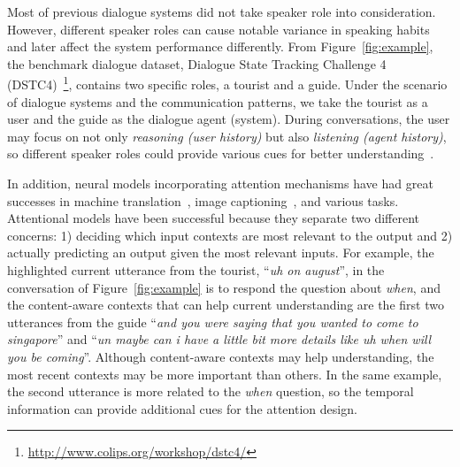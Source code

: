\documentclass{article}
\begin{document}

Most of previous dialogue systems did not take speaker role into consideration.
However, different speaker roles can cause notable variance in speaking habits and later affect the system performance differently. 
From Figure~\ref{fig:example}, the benchmark dialogue dataset, Dialogue State Tracking Challenge 4 (DSTC4)~\cite{kim2016fourth}\footnote{\url{http://www.colips.org/workshop/dstc4/}}, contains two specific roles, a tourist and a guide.
Under the scenario of dialogue systems and the communication patterns, we take the tourist as a user and the guide as the dialogue agent (system).
During conversations, the user may focus on not only \emph{reasoning (user history)} but also \emph{listening (agent history)}, so different speaker roles could provide various cues for better understanding~\cite{chi2017speaker}.

In addition, neural models incorporating attention mechanisms have had great successes in machine translation~\cite{bahdanau2014neural}, image captioning~\cite{xu2015show}, and various tasks. 
Attentional models have been successful because they separate two different concerns: 1) deciding which input contexts are most relevant to the output and 2) actually predicting an output given the most relevant inputs. 
For example, the highlighted current utterance from the tourist, ``\textit{uh on august}'', in the conversation of Figure~\ref{fig:example} is to respond the question about \textit{when}, and the content-aware contexts that can help current understanding are the first two utterances from the guide ``\textit{and you were saying that you wanted to come to singapore}'' and ``\textit{un maybe can i have a little bit more details like uh when will you be coming}''.
Although content-aware contexts may help understanding, the most recent contexts may be more important than others.
In the same example, the second utterance is more related to the \textit{when} question, so the temporal information can provide additional cues for the attention design.
\end{document}

